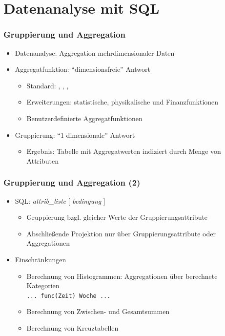     
\section{Datenanalyse mit SQL}

\begin{frame}
    \frametitle{Gruppierung und Aggregation}
    
    \begin{itemize}
    \item Datenanalyse: Aggregation mehrdimensionaler Daten
    \item Aggregatfunktion: "`dimensionsfreie"' Antwort
    \begin{itemize}
    \item Standard: , , , 
    \item Erweiterungen: statistische, physikalische und Finanzfunktionen
    \item Benutzerdefinierte Aggregatfunktionen
    \end{itemize}
    \item Gruppierung: "`1-dimensionale"' Antwort
    \begin{itemize}
    \item Ergebnis: Tabelle mit Aggregatwerten indiziert durch Menge von Attributen
    \end{itemize}
    \end{itemize}
    
    \end{frame}
    
    
    \begin{frame}
    \frametitle{Gruppierung und Aggregation (2)}
    
    \begin{itemize}
    \item SQL: \emph{ attrib\_liste} [  \emph{bedingung} ]
    \begin{itemize}
    \item Gruppierung bzgl. gleicher Werte der Gruppierungsattribute
    \item Abschließende Projektion nur über Gruppierungsattribute oder
      Aggregationen
    \end{itemize}
    \item Einschränkungen
    \begin{itemize}
    \item Berechnung von Histogrammen: Aggregationen über berechnete
      Kategorien\\
    \texttt{...  func(Zeit)  Woche ...}
    \item Berechnung von Zwischen- und Gesamtsummen
    \item Berechnung von Kreuztabellen
    \end{itemize}
    \end{itemize}
    
    \end{frame}
    
